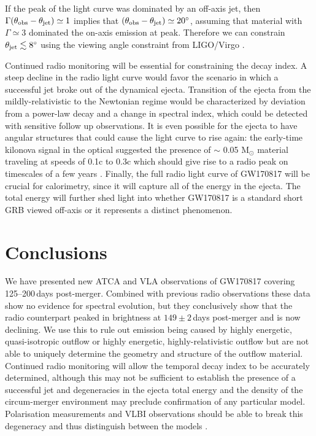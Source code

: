 If the peak of the light curve was dominated by an off-axis jet, then $\Gamma(\theta_{\rm obs}-\theta_{\rm jet})\simeq1$ \citep[where the bulk Lorentz factor of the jet is $\Gamma$, the off-axis angle of the observer is $\theta_{\rm obs}$, and the opening angle of the jet is $\theta_{\rm jet}$]{2018MNRAS.478..407N} implies that $(\theta_{\rm obs}-\theta_{\rm jet})\simeq20\mbox{$^\circ$}$, assuming that material with $\Gamma\simeq3$ dominated the on-axis emission at peak. Therefore we can constrain $\theta_{\rm jet}\lesssim 8\mbox{$^\circ$}$ using the viewing angle constraint from LIGO/Virgo \citep[$\theta_{\rm obs}<28\arcdeg$;][]{2017PhRvL.119p1101A}. 

Continued radio monitoring will be essential for constraining the decay index. A steep decline in the radio light curve would favor the scenario in which a successful jet broke out of the dynamical ejecta. Transition of the ejecta from the mildly-relativistic to the Newtonian regime would be characterized by deviation from a power-law decay and a change in spectral index, which could be detected with sensitive follow up observations. It is even possible for the ejecta to have angular structures that could cause the light curve to rise again: the early-time kilonova signal in the optical suggested the presence of $\sim$ 0.05 M${_\odot}$ material traveling at speeds of 0.1c to 0.3c which should give rise to a radio peak on timescales of a few years \citep{2017ApJ...848L..21A,2011Natur.478...82N,2018MNRAS.478..407N}. Finally, the full radio light curve of GW170817 will be crucial for calorimetry, since it will capture all of the energy in the ejecta. The total energy will further shed light into whether GW170817 is a standard short GRB viewed off-axis or it represents a distinct phenomenon.




\vspace{-7pt}
\section{Conclusions}
\vspace{-7pt}
We have presented new ATCA and VLA observations of GW170817 covering 125--200\,days post-merger. Combined with previous radio observations these data show no evidence for spectral evolution, but they conclusively show that the radio counterpart peaked in brightness at $149\pm2$\,days post-merger and is now declining. We use this to rule out emission being caused by highly energetic, quasi-isotropic outflow or highly energetic, highly-relativistic outflow but are not able to uniquely determine the geometry and structure of the outflow material. Continued radio monitoring will allow the temporal decay index to be accurately determined, although this may not be sufficient to establish the presence of a successful jet \citep{2018MNRAS.478..407N} and degeneracies in the ejecta total energy and the density of the circum-merger environment may preclude confirmation of any particular model. Polarisation measurements and VLBI observations should be able to break this degeneracy and thus distinguish between the models \citep[also see][]{2018MNRAS.478.4128G}.